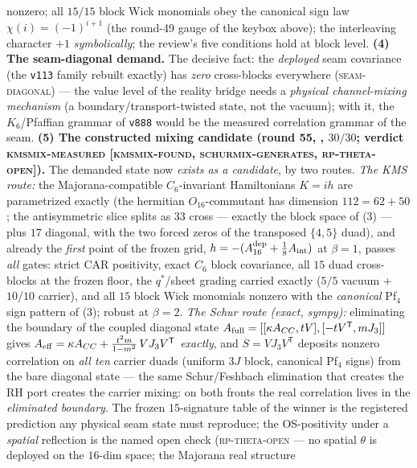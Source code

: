 \begin{keybox}
nonzero; all $15/15$ block Wick monomials obey the canonical
sign law $\chi(i) = (-1)^{i+1}$ (the round-49 gauge of the
keybox above); the interleaving character $+1$
\emph{symbolically}; the review's five conditions hold at
block level.  \textbf{(4) The seam-diagonal demand.}  The
decisive fact: the \emph{deployed} seam covariance (the
\texttt{v113} family rebuilt exactly) has \emph{zero}
cross-blocks everywhere (\textsc{seam-diagonal}) --- the value
level of the reality bridge needs a \emph{physical
channel-mixing mechanism} (a boundary/transport-twisted state,
not the vacuum); with it, the $K_6$/Pfaffian grammar of
\texttt{v888} would be the measured correlation grammar of the
seam.  \textbf{(5) The constructed mixing candidate (round 55,
, $30/30$; verdict
\textsc{kmsmix-measured [kmsmix-found, schurmix-generates,
rp-theta-open]}).}  The demanded state now \emph{exists as a
candidate}, by two routes.  \emph{The KMS route:} the
Majorana-compatible $C_6$-invariant Hamiltonians $K = ih$ are
parametrized exactly (the hermitian $O_{16}$-commutant has
dimension $112 = 62 + 50$; the antisymmetric slice splits as
$33$ cross --- exactly the block space of (3) --- plus $17$
diagonal, with the two forced zeros of the transposed $\{4,5\}$
duad), and already the \emph{first} point of the frozen grid,
$h = -(A_{16}^{\rm dep} + \tfrac18 A_{\rm int})$ at $\beta = 1$,
passes \emph{all} gates: strict CAR positivity, exact $C_6$
block covariance, all $15$ duad cross-blocks at the frozen
floor, the $q^{*}$/sheet grading carried exactly ($5/5$ vacuum
$+$ $10/10$ carrier), and all $15$ block Wick monomials nonzero
with the \emph{canonical} Pf$_4$ sign pattern of (3); robust at
$\beta = 2$.  \emph{The Schur route (exact, sympy):} eliminating
the boundary of the coupled diagonal state $A_{\rm full} =
[[\kappa A_{CC}, tV], [-tV^{\mathsf T}, mJ_3]]$ gives $A_{\rm
eff} = \kappa A_{CC} + \tfrac{t^{2}m}{1 - m^{2}}\, V J_3
V^{\mathsf T}$ \emph{exactly}, and $S = V J_3 V^{\mathsf T}$
deposits nonzero correlation on \emph{all ten} carrier duads
(uniform $3J$ block, canonical Pf$_4$ signs) from the bare
diagonal state --- the same Schur/Feshbach elimination that
creates the RH port creates the carrier mixing: on both fronts
the real correlation lives in the \emph{eliminated boundary}.
The frozen $15$-signature table of the winner is the registered
prediction any physical seam state must reproduce; the
OS-positivity under a \emph{spatial} reflection is the named
open check (\textsc{rp-theta-open} --- no spatial $\theta$ is
deployed on the $16$-dim space; the Majorana real structure

\end{keybox}

